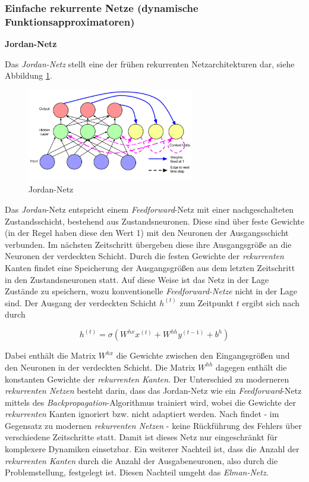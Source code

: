 \subsubsection{Einfache rekurrente Netze (dynamische Funktionsapproximatoren)}
\label{cha:recurrent_simple}
\textbf{Jordan-Netz}

Das \textit{Jordan-Netz} stellt eine der frühen rekurrenten Netzarchitekturen dar, siehe Abbildung \ref{fig:jordan}. 

\begin{figure} [h]
	\centering
	\includegraphics[width=0.65\textwidth]{images/jordan}
	\caption{Jordan-Netz \cite{Lipton.5292015}}
	\label{fig:jordan}
\end{figure}


Das \textit{Jordan}-Netz entspricht einem \textit{Feedforward}-Netz mit einer nachgeschalteten Zustandsschicht, bestehend aus Zustandsneuronen. Diese sind über feste Gewichte (in der Regel haben diese den Wert 1) mit den Neuronen der Ausgangsschicht verbunden. Im nächsten Zeitschritt übergeben diese ihre Ausgangsgröße an die Neuronen der verdeckten Schicht. Durch die festen Gewichte der \textit{rekurrenten} Kanten findet eine Speicherung der Ausgangsgrößen aus dem letzten Zeitschritt in den Zustandsneuronen statt. Auf diese Weise ist das Netz in der Lage Zustände zu speichern, wozu konventionelle \textit{Feedforward-Netze} nicht in der Lage sind. Der Ausgang der verdeckten Schicht $h^{(t)}$ zum Zeitpunkt $t$ ergibt sich nach \cite{Jordan.1997} durch

\begin{equation}
h^{(t)} = \sigma(W^{hx}x^{(t)} + W^{hh}y^{(t-1)} + b^{h})
\end{equation}

Dabei enthält die Matrix $W^{hx}$ die Gewichte zwischen den Eingangsgrößen und den Neuronen in der verdeckten Schicht. Die Matrix $W^{hh}$ dagegen enthält die konstanten Gewichte der \textit{rekurrenten Kanten}. Der Unterschied zu moderneren \textit{rekurrenten Netzen} besteht darin, dass das Jordan-Netz wie ein \textit{Feedforward}-Netz mittels des \textit{Backpropagation}-Algorithmus trainiert wird, wobei die Gewichte der \textit{rekurrenten} Kanten ignoriert bzw. nicht adaptiert werden. Nach \cite{Lipton.5292015} findet - im Gegensatz zu modernen \textit{rekurrenten Netzen} - keine Rückführung des Fehlers über verschiedene Zeitschritte statt. Damit ist dieses Netz nur eingeschränkt für komplexere Dynamiken einsetzbar. \cite{Lipton.5292015} Ein weiterer Nachteil ist, dass die Anzahl der \textit{rekurrenten Kanten} durch die Anzahl der Ausgabeneuronen, also durch die Problemstellung, festgelegt ist. Diesen Nachteil umgeht das \textit{Elman-Netz}.

